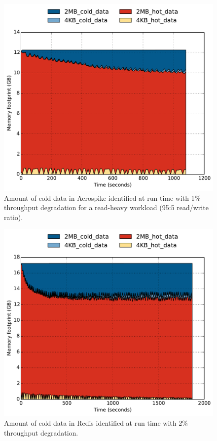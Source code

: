 \begin{figure}[t]
\centering
\includegraphics[width=1.0\columnwidth]{asplos2017/figures/aero-new-policy-24perSlow-capacity_over_time.pdf}
\caption{Amount of cold data in Aerospike identified at run time with 1\%
throughput degradation for a read-heavy workload (95:5 read/write ratio).}
\label{fig:aerospike-capacity}
\end{figure}

\begin{figure}[t]
\centering
\includegraphics[width=1.0\columnwidth]{asplos2017/figures/redis-skewed-kstaled5-sample5-capacity_over_time.pdf}
\caption{Amount of cold data in Redis identified at run time with 2\%
throughput degradation.}
\label{fig:redis-skewed-hotspot-capacity}
\end{figure}


